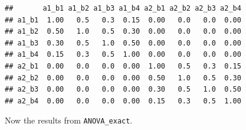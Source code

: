 \documentclass[
]{book}
\newenvironment{Shaded}{\begin{snugshade}}{\end{snugshade}}
\newcommand{\DataTypeTok}[1]{\textcolor[rgb]{0.13,0.29,0.53}{#1}}
\newcommand{\DecValTok}[1]{\textcolor[rgb]{0.00,0.00,0.81}{#1}}
\newcommand{\FloatTok}[1]{\textcolor[rgb]{0.00,0.00,0.81}{#1}}
\newcommand{\KeywordTok}[1]{\textcolor[rgb]{0.13,0.29,0.53}{\textbf{#1}}}
\newcommand{\NormalTok}[1]{#1}
\newcommand{\OperatorTok}[1]{\textcolor[rgb]{0.81,0.36,0.00}{\textbf{#1}}}
\newcommand{\OtherTok}[1]{\textcolor[rgb]{0.56,0.35,0.01}{#1}}
\newcommand{\StringTok}[1]{\textcolor[rgb]{0.31,0.60,0.02}{#1}}
\begin{document}
\begin{Shaded}
\end{Shaded}

\begin{verbatim}
##       a1_b1 a1_b2 a1_b3 a1_b4 a2_b1 a2_b2 a2_b3 a2_b4
## a1_b1  1.00   0.5   0.3  0.15  0.00   0.0   0.0  0.00
## a1_b2  0.50   1.0   0.5  0.30  0.00   0.0   0.0  0.00
## a1_b3  0.30   0.5   1.0  0.50  0.00   0.0   0.0  0.00
## a1_b4  0.15   0.3   0.5  1.00  0.00   0.0   0.0  0.00
## a2_b1  0.00   0.0   0.0  0.00  1.00   0.5   0.3  0.15
## a2_b2  0.00   0.0   0.0  0.00  0.50   1.0   0.5  0.30
## a2_b3  0.00   0.0   0.0  0.00  0.30   0.5   1.0  0.50
## a2_b4  0.00   0.0   0.0  0.00  0.15   0.3   0.5  1.00
\end{verbatim}

Now the results from \texttt{ANOVA\_exact}.

\begin{Shaded}
\end{Shaded}
\end{document}
